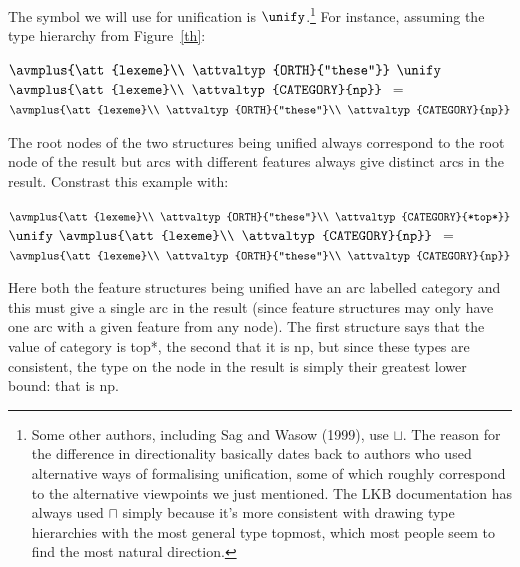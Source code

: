 \documentclass[12pt]{report}
\begin{document}
The symbol we will use for
unification is $\unify$.\footnote{Some other authors, including 
Sag and Wasow (1999), use
$\sqcup$.  The reason for the difference in directionality
basically dates back to authors who used alternative ways of formalising
unification, some of which roughly correspond to the alternative
viewpoints we just mentioned.  The LKB documentation
has always used $\sqcap$ simply because
it's more consistent with drawing type hierarchies with the most
general type topmost, which most people seem to find the most natural
direction.}
For instance, assuming the type
hierarchy from Figure~\ref{th}:
\begin{ex}
{\tiny $\avmplus{\att{lexeme}\\                                             
\attvaltyp{ORTH}{"these"}}$} $\unify$
{\tiny $\avmplus{\att{lexeme}\\
\attvaltyp{CATEGORY}{np}}$}
$=$
{\tiny $\avmplus{\att{lexeme}\\
\attvaltyp{ORTH}{"these"}\\
\attvaltyp{CATEGORY}{np}}$}
\end{ex}
The root nodes of the two structures being
unified always correspond to the root node of the result
but arcs with different features always give distinct
arcs in the result.
Constrast this example with:
\begin{ex}
{\tiny $\avmplus{\att{lexeme}\\ 
\attvaltyp{ORTH}{"these"}\\                                            
\attvaltyp{CATEGORY}{*top*}}$} $\unify$
{\tiny $\avmplus{\att{lexeme}\\
\attvaltyp{CATEGORY}{np}}$}
$=$
{\tiny $\avmplus{\att{lexeme}\\                                              
\attvaltyp{ORTH}{"these"}\\
\attvaltyp{CATEGORY}{np}}$}
\end{ex}
Here both the feature structures being unified have an
arc labelled {\feature category} and this must give a single
arc in the result (since feature structures may 
only have one arc with a given feature from any node).
The first structure says that the value of {\feature category}
is {\type *top*}, the second that it is {\type np}, but
since these types are consistent, the type on the
node in the result is simply their greatest lower bound:
that is {\type np}.
\end{document}
